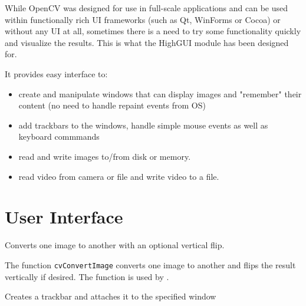 While OpenCV was designed for use in full-scale
applications and can be used within functionally rich UI frameworks (such as Qt, WinForms or Cocoa) or without any UI at all, sometimes there is a need to try some functionality quickly and visualize the results. This is what the HighGUI module has been designed for.

It provides easy interface to:
\begin{itemize}
    \item create and manipulate windows that can display images and "remember" their content (no need to handle repaint events from OS)
    \item add trackbars to the windows, handle simple mouse events as well as keyboard commmands
    \item read and write images to/from disk or memory.
    \item read video from camera or file and write video to a file.
\end{itemize}

\ifCPy

\section{User Interface}

\ifC
{} %
Converts one image to another with an optional vertical flip.


\begin{description}
\end{description}

The function \texttt{cvConvertImage} converts one image to another and flips the result vertically if desired. The function is used by .

\fi

Creates a trackbar and attaches it to the specified window

